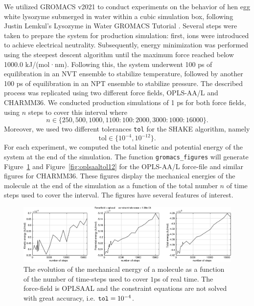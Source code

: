 \documentclass[runningheads]{llncs}
\begin{document}
We utilized GROMACS v2021 to conduct experiments on the behavior of hen egg white lysozyme submerged in water within a cubic simulation box, following Justin Lemkul's Lysozyme in Water GROMACS Tutorial \cite{}. Several steps were taken to prepare the system for production simulation: first, ions were introduced to achieve electrical neutrality. Subsequently, energy minimization was performed using the steepest descent algorithm until the maximum force reached below 1000.0 kJ/(mol·nm). Following this, the system underwent 100 ps of equilibration in an NVT ensemble to stabilize temperature, followed by another 100 ps of equilibration in an NPT ensemble to stabilize pressure. The described process was replicated using two different force fields, OPLS-AA/L and CHARMM36. We conducted production simulations of 1 ps for both force fields, using $n$ steps to cover this interval where
\begin{equation}
  n \in \{250, 500, 1000, 1100:100:2000, 3000:1000:16000\}.
\end{equation}
Moreover, we used two different tolerances {\tt tol} for the SHAKE algorithm, namely
\begin{equation}
  \text{tol} \in \{10^{-4}, 10^{-12}\}.
\end{equation}
For each experiment, we computed the total kinetic and potential energy of the system at the end of the simulation.
The function {\tt gromacs\_figures} will generate Figure~\ref{fig:oplsaaltol04} and Figure~\ref{fig:oplsaaltol12} for the OPLS-AA/L force-file and similar figures for CHARMM36. These figures display the mechanical energies of the molecule at the end of the simulation as a function of the total number $n$ of time steps used to cover the interval. The figures have several features of interest.

\begin{figure}
  \centering
  \includegraphics[width=12cm]{oplsaaltol04.pdf}
  \caption{The evolution of the mechanical energy of a molecule as a function of the number of time-steps used to cover $1$ps of real time. The force-field is OPLSAAL and the constraint equations are not solved with great accuracy, i.e. ${\tt tol} = 10^{-4}$. } \label{fig:oplsaaltol04}
\end{figure}
\end{document}
